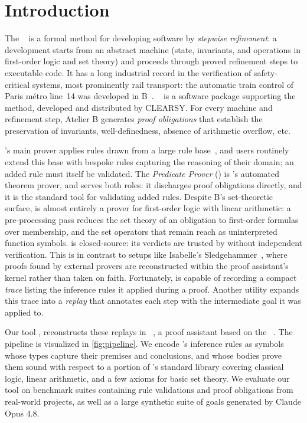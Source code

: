 \section{Introduction}\label{sec:intro}

The \bmethod~\cite{abrial1996bbook} is a formal method for developing software
by \emph{stepwise refinement}: a development starts from an abstract machine
(state, invariants, and operations in first-order logic and set theory) and
proceeds through proved refinement steps to executable code.
%
It has a long industrial record in the verification of safety-critical systems,
most prominently rail transport: the automatic train control of Paris métro
line~14 was developed in B~\cite{behm1999meteor}.
%
\ab~\cite{clearsy_atelierb} is a software package supporting the method,
developed and distributed by CLEARSY.
%
For every machine and refinement step, Atelier B generates
\emph{proof obligations} that establish the preservation of invariants,
well-definedness, absence of arithmetic overflow, etc.
%

\ab's main prover applies rules drawn from a large rule
base~\cite{lecomte2024provingb}, and users routinely extend this base
with bespoke rules capturing the reasoning of their domain; an added
rule must itself be validated.
%
The \emph{Predicate Prover} (\pp) is \ab's automated theorem prover,
and serves both roles: it discharges proof obligations directly, and it
is the standard tool for validating added rules.
%
Despite B's set-theoretic surface, \pp{} is almost entirely a prover for
first-order logic with linear arithmetic: a pre-processing pass reduces
the set theory of an obligation to first-order formulas over membership,
and the set operators that remain reach \pp{} as uninterpreted function
symbols.
%
\pp{} is closed-source: its verdicts are trusted by \ab{} without
independent verification.
%
This is in contrast to setups like Isabelle's
Sledgehammer~\cite{sledgehammer}, where proofs found by external provers
are reconstructed within the proof assistant's kernel rather than taken
on faith.
%
Fortunately, \pp{} is capable of recording a compact \emph{trace} listing the
inference rules it applied during a proof.
%
Another utility expands this trace into a \emph{replay} that annotates
each step with the intermediate goal it was applied to.

%
Our tool \tool, reconstructs these replays in \lp~\cite{hondet:hal-02981561},
a proof assistant based on the \lpcmr~\cite{CousineauDowek}.
%
The pipeline is visualized in \autoref{fig:pipeline}.
%
We encode \pp's inference rules as \lp{} symbols whose types capture their
premises and conclusions, and whose bodies prove them sound with respect to
a portion of \lp{}'s standard library covering classical logic, linear
arithmetic, and a few axioms for basic set theory.
%
We evaluate our tool on benchmark suites containing rule validations
and proof obligations from real-world \ab{} projects, as well as a large
synthetic suite of goals generated by Claude Opus 4.8.
%



